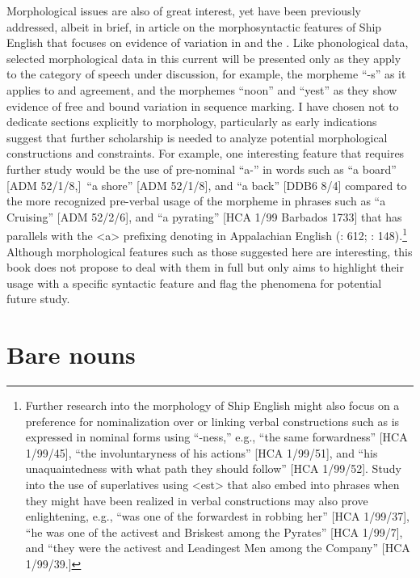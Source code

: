 Morphological issues are also of great interest, yet have been previously addressed, albeit in brief, in  article on the morphosyntactic features of Ship English that focuses on evidence of variation in  and the . Like phonological data, selected morphological data in this current  will be presented only as they apply to the category of speech under discussion, for example, the morpheme “-s” as it applies to  and   agreement, and the morphemes “noon” and “yest” as they show evidence of free and bound variation in sequence marking. I have chosen not to dedicate sections explicitly to morphology, particularly as early indications suggest that further scholarship is needed to analyze potential morphological constructions and constraints. For example, one interesting feature that requires further study would be the use of pre-nominal “a-” in words such as “a board” [ADM 52/1/8,]~“a shore” [ADM 52/1/8], and “a back” [DDB6 8/4] compared to the more recognized pre-verbal usage of the morpheme in phrases such as “a Cruising” [ADM 52/2/6], and “a pyrating” [HCA 1/99 Barbados {1733}] that has parallels with the <a> prefixing denoting  in Appalachian English (\citealt{Hickey2004}: 612; \citealt{Montgomery2001}: 148).\footnote{Further research into the morphology of Ship English might also focus on a preference for nominalization over  or linking verbal constructions such as is expressed in nominal forms using “-ness,” e.g., “the same forwardness” [HCA 1/99/45], “the involuntaryness of his actions” [HCA 1/99/51], and “his unaquaintedness with what path they should follow” [HCA 1/99/52]. Study into the use of  superlatives using <est> that also embed into  phrases when they might have been realized in verbal constructions may also prove enlightening, e.g., “was one of the forwardest in robbing her” [HCA 1/99/37], “he was one of the activest and Briskest among the Pyrates” [HCA 1/99/7], and “they were the activest and Leadingest Men among the Company” [HCA 1/99/39.]} Although morphological features such as those suggested here are interesting, this book does not propose to deal with them in full but only aims to highlight their usage with a specific syntactic feature and flag the phenomena for potential future study. 

\section{{Bare nouns}}\label{sec:5.2}

